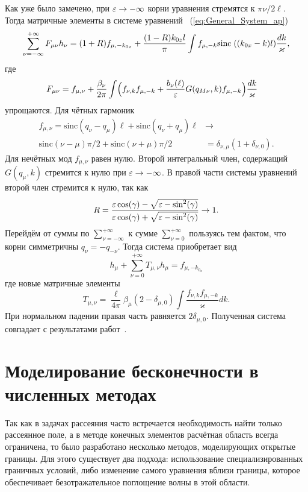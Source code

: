 Как уже было замечено, при $\varepsilon \to -\infty$ корни уравнения стремятся к $\pi \nu/2\ell$. Тогда матричные элементы в системе уравнений ~(\ref{eq:General_System_ap})
\begin{align}
	\sum_{\nu=-\infty}^{+\infty} F_{\mu \nu} h_\nu = (1+R)f_{\mu,-k_{0x}} + \frac{(1-R)k_{0z} l}{\pi}\int f_{\mu,-k}\mathrm{sinc}\;((k_{0x}-k)l) \frac{dk}{\varkappa}, \label{eq:General_System_ap}
\end{align}
где 
\begin{align}
F_{\mu \nu} &= f_{\mu,\nu} + \frac{\beta_\nu}{2\pi}\int
\Bigl(f_{\nu,k}f_{\mu,-k}  + \frac{b_\nu(\ell)}{\varepsilon} G(q_{M\nu},k)f_{\mu,-k} \Bigr)\frac{dk}{\varkappa}
\label{eq:F_mn_ap}
\end{align}
упрощаются. Для чётных гармоник 
\begin{align}
    f_{\mu,\nu} = \text{sinc}(q_\nu - q_\mu)\ell + \text{sinc}(q_\nu +q_\mu)\ell &\to \\
    \text{sinc}(\nu - \mu)\pi/2 + \text{sinc}(\nu +\mu)\pi/2& = \delta_{\nu,\mu}(1 + \delta_{\nu,0}). \nonumber
\end{align}
Для нечётных мод $f_{\mu,\nu}$ равен нулю. Второй интегральный член, содержащий $G(q_\mu,k)$ стремится к нулю при $\varepsilon \to -\infty$. В правой части системы уравнений второй член стремится к нулю, так как 
$$
R = \frac{\varepsilon \cos(\gamma) - \sqrt{\varepsilon - \sin^2(\gamma)}}{\varepsilon \cos(\gamma) + \sqrt{\varepsilon - \sin^2(\gamma)}}\to 1.
$$
Перейдём от суммы по $\sum_{\nu = -\infty}^{+\infty}$ к сумме $\sum_{\nu = 0}^{+\infty}$ пользуясь тем фактом, что корни симметричны $q_\nu = -q_{-\nu}$. Тогда система приобретает вид
\begin{equation}
    h_\mu + \sum_{\nu = 0}^{+\infty}T_{\mu,\nu}h_\mu = f_{\mu,-k_{0_x}}
\end{equation}
где новые матричные элементы 
\begin{equation}
    T_{\mu,\nu} = \frac{\ell}{4 \pi}\beta_\mu (2 - \delta_{\mu,0})\int
\frac{f_{\nu,k}f_{\mu,-k}}{\varkappa}dk.
\end{equation}
При нормальном падении правая часть равняется $2 \delta_{\mu,0}$. Полученная система совпадает с результатами работ~\cite{Shapiro16,sturman2010transmission}.
\chapter{Моделирование бесконечности в численных методах}
Так как в задачах рассеяния часто встречается необходимость найти только рассеянное поле, а в методе конечных элементов расчётная область всегда ограничена, то было разработано несколько методов, моделирующих открытые границы. Для этого существует два подхода: использование специализированных граничных условий, либо изменение самого уравнения вблизи границы, которое обеспечивает безотражательное поглощение волны в этой области.


